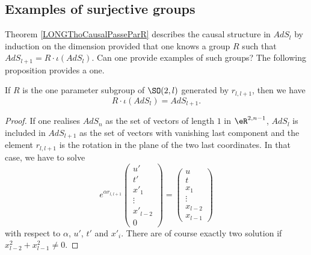 %
\subsection{Examples of surjective groups}
%

Theorem \ref{LONGThoCausalPasseParR} describes the causal structure in $AdS_l$ by induction on the dimension provided that one knows a group $R$ such that $AdS_{l+1}=R\cdot \iota(AdS_l)$. Can one provide examples of such groups? The following proposition provides a one.

\begin{proposition}        \label{LONGPropSurjectif}
    If $R$ is the one parameter subgroup of $\SO(2,l)$ generated by $r_{l,l+1}$, then we have
    \begin{equation}
        R\cdot \iota(AdS_l)= AdS_{l+1}.
    \end{equation}
\end{proposition}

%
%
%
%
%
%
%
%
%
%
%
%
%
%
%
%
%
%
%
%
%
%
%
%
%
%
%
%
%
%
%
%
%
%
%
%
%
%
%
%
%
%
%
%

\begin{proof}
    If one realises $AdS_n$ as the set of vectors of length $1$ in $\eR^{2,n-1}$, $AdS_l$ is included in $AdS_{l+1}$ as the set of vectors with vanishing last component and the element $r_{l,l+1}$ is the rotation in the plane of the two last coordinates. In that case, we have to solve
    \begin{equation}
        e^{\alpha r_{l,l+1}}\begin{pmatrix}
            u'    \\ 
            t'    \\ 
            x'_1    \\ 
            \vdots    \\ 
            x'_{l-2}    \\ 
            0    
        \end{pmatrix}=
        \begin{pmatrix}
            u    \\ 
            t    \\ 
            x_1    \\ 
            \vdots    \\ 
            x_{l-2}    \\ 
            x_{l-1}    
        \end{pmatrix}
    \end{equation}
    with respect to $\alpha$, $u'$, $t'$ and $x'_i$. There are of course exactly two solution if $x_{l-2}^2+x_{l-1}^2\neq 0$.
\end{proof}

